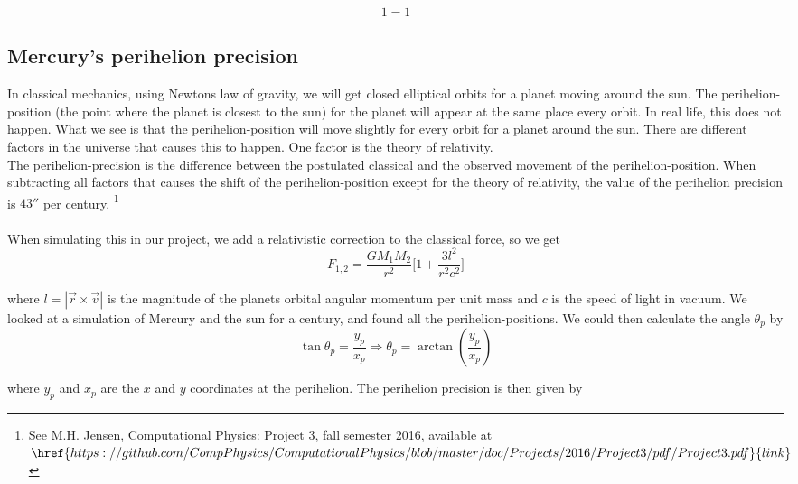 \documentclass[%
 reprint,
 nobalance,
 amsmath,amssymb,
 aps,
]{revtex4-1}
\begin{document}
\begin{equation}\label{eq:22} %
	1 = 1
\end{equation}

\subsection{\label{sec:Thi} Mercury's perihelion precision}

In classical mechanics, using Newtons law of gravity, we will get closed elliptical orbits for a planet moving around the sun. The perihelion-position (the point where the planet is closest to the sun) for the planet will appear at the same place every orbit. In real life, this does not happen. What we see is that the perihelion-position will move slightly for every orbit for a planet around the sun. There are different factors in the universe that causes this to happen. One factor is the theory of relativity. \\
The perihelion-precision is the difference between the postulated classical and the observed movement of the perihelion-position. When subtracting all factors that causes the shift of the perihelion-position except for the theory of relativity, the value of the perihelion precision is $43''$ per century. \footnote{See M.H. Jensen, Computational Physics: Project 3, fall semester 2016, available at $\href{https://github.com/CompPhysics/ComputationalPhysics/blob/master/doc/Projects/2016/Project3/pdf/Project3.pdf}{link}$}
\\\\
When simulating this in our project, we add a relativistic correction to the classical force, so we get
\begin{equation}
F_{1,2} = \frac{GM_1M_2}{r^2}\bigg[ 1 + \frac{3l^2}{r^2c^2}\bigg]
\end{equation}

where $l = |\vec{r} \times \vec{v}|$ is the magnitude of the planets orbital angular momentum per unit mass and $c$ is the speed of light in vacuum. We looked at a simulation of Mercury and the sun for a century, and found all the perihelion-positions. We could then calculate the angle $\theta_p$ by 
\begin{equation}
\tan \theta_p = \frac{y_p}{x_p} \Rightarrow \theta_p = \arctan(\frac{y_p}{x_p})
\end{equation}

where $y_p$ and $x_p$ are the $x$ and $y$ coordinates at the perihelion. The perihelion precision is then given by
\end{document}
